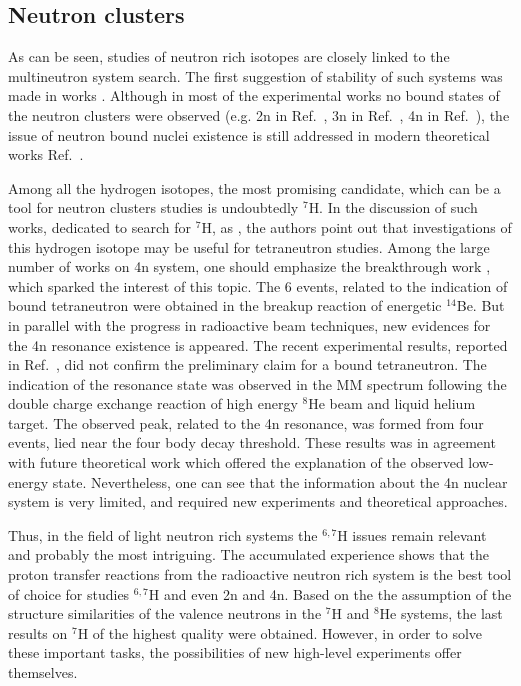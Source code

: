 \subsection{Neutron clusters}

As can be seen, studies of neutron rich isotopes are closely linked to the multineutron system search.
The first suggestion of stability of such systems was made in works \cite{Zeldovich:1960,Goldansky:1960}.
Although in most of the experimental works no bound states of the neutron clusters were observed (e.g. 2n in Ref.\ \cite{Voitovetsky:1955}, 3n in Ref.\ \cite{belozyorov:1988}, 4n in Ref.\ \cite{Marques_PhysRev:2002,Kisamori:2016}), the issue of neutron bound nuclei existence is still addressed in modern theoretical works Ref.\ \cite{Pieper:2003,Timofeyuk:2003b,Higgins:2021}.

Among all the hydrogen isotopes, the most promising candidate, which can be a tool for neutron clusters studies is undoubtedly $^{7}$H. 
In the discussion of such works, dedicated to search for $^{7}$H, as \cite{Caamano:2008}, the authors point out that investigations of this hydrogen isotope may be useful for tetraneutron studies.  
Among the large number of works on 4n system, one should emphasize the breakthrough work \cite{Marques_PhysRev:2002}, which sparked the interest of this topic.
The 6 events, related to the indication of bound tetraneutron were obtained in the breakup reaction of energetic $^{14}$Be.
But in parallel with the progress in radioactive beam techniques, new evidences for the 4n resonance existence is appeared.
The recent experimental results, reported in Ref.\ \cite{Kisamori:2016}, did not confirm the preliminary claim for a bound tetraneutron.
The indication of the resonance state was observed in the MM spectrum following the double charge exchange reaction of high energy $^{8}$He beam and liquid helium target. 
The observed peak, related to the 4n resonance, was formed from four events, lied near the four body decay threshold.
These results was in agreement with future theoretical work \cite{Shirokov:2016,Higgins:2021} which offered the explanation of the observed low-energy state.
Nevertheless, one can see that the information about the 4n nuclear system is very limited, and required new experiments and theoretical approaches.

Thus, in the field of light neutron rich systems the $^{6,7}$H issues remain relevant and probably the most intriguing.
The accumulated experience shows that the proton transfer reactions from the radioactive neutron rich system is the best tool of choice for studies $^{6,7}$H and even 2n and 4n.
Based on the the assumption of the structure similarities of the valence neutrons in the $^{7}$H and $^{8}$He systems, the last results on $^{7}$H of the highest quality were obtained.
However, in order to solve these important tasks, the possibilities of new high-level experiments offer themselves. 

